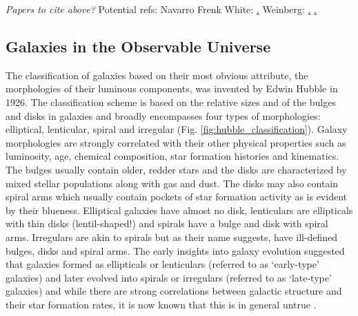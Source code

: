 \emph{Papers to cite above?}
Potential refs:
Navarro Frenk White: \href{http://iopscience.iop.org/article/10.1086/304888/meta}.
Weinberg: \href{https://www.pnas.org/content/112/40/12249#ref-4}.
\href{http://adsabs.harvard.edu/doi/10.1086/156499}.

\subsection{Galaxies in the Observable Universe}

The classification of galaxies based on their most obvious attribute, the morphologies of their luminous components, was invented by Edwin Hubble in 1926. The classification scheme is based on the relative sizes and of the bulges and disks in galaxies and broadly encompasses four types of morphologies: elliptical, lenticular, spiral and irregular (Fig. \ref{fig:hubble_classification}). Galaxy morphologies are strongly correlated with their other physical properties such as luminosity, age, chemical composition, star formation histories and kinematics. The bulges usually contain older, redder stars and the disks are characterized by mixed stellar populations along with gas and dust. The disks may also contain spiral arms which usually contain pockets of star formation activity as is evident by their blueness. Elliptical galaxies have almost no disk, lenticulars are ellipticals with thin disks (lentil-shaped!) and spirals have a bulge and disk with spiral arms. Irregulars are akin to spirals but as their name suggests, have ill-defined bulges, disks and spiral arms. The early insights into galaxy evolution suggested that galaxies formed as ellipticals or lenticulars (referred to as `early-type' galaxies) and later evolved into spirals or irregulars (referred to as `late-type' galaxies) and while there are strong correlations between galactic structure and their star formation rates, it is now known that this is in general untrue .\\


